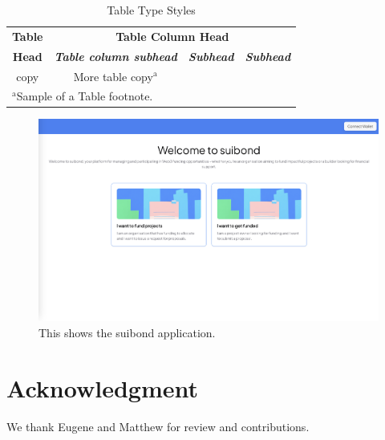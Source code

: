 \documentclass[conference]{IEEEtran}
\begin{document}
\begin{table}[htbp]
\caption{Table Type Styles}
\begin{center}
\begin{tabular}{|c|c|c|c|}
\hline
\textbf{Table}&\multicolumn{3}{|c|}{\textbf{Table Column Head}} \\
\cline{2-4} 
\textbf{Head} & \textbf{\textit{Table column subhead}}& \textbf{\textit{Subhead}}& \textbf{\textit{Subhead}} \\
\hline
copy& More table copy$^{\mathrm{a}}$& &  \\
\hline
\multicolumn{4}{l}{$^{\mathrm{a}}$Sample of a Table footnote.}
\end{tabular}
\label{tab1}
\end{center}
\end{table}

\begin{figure}[htbp]
\centerline{\includegraphics[scale=0.1]{suibond.png}}
\caption{This shows the suibond application.}
\label{fig}
\end{figure}


\section*{Acknowledgment}

We thank Eugene and Matthew for review and contributions.



\end{document}
